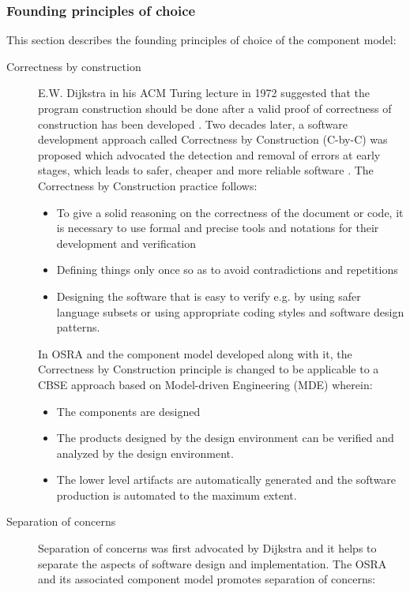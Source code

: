 \subsubsection{\textbf{Founding principles of choice}}
This section describes the founding principles of choice of the component model:

\begin{description}
\item[Correctness by construction] E.W. Dijkstra in his ACM Turing lecture in 1972 suggested that the program construction should be done after a valid proof of correctness of construction has been developed \cite{CompBasedProcess}. Two decades later, a software development approach called Correctness by Construction (C-by-C) was proposed which advocated the detection and removal of errors at early stages, which leads to safer, cheaper and more reliable software \cite{CompBasedProcess,PhdThesis}. The Correctness by Construction practice follows:
\begin{itemize}
\item To give a solid reasoning on the correctness of the document or code, it is necessary to use formal and precise tools and notations for their development and verification 
\item Defining things only once so as to avoid contradictions and repetitions
\item Designing the software that is easy to verify e.g. by using safer language subsets or using appropriate coding styles and software design patterns. 
\end{itemize}

In OSRA and the component model developed along with it, the Correctness by Construction principle is changed to be applicable to a CBSE approach based on Model-driven Engineering (MDE) \cite{CompBasedProcess} wherein:

\begin{itemize}
\item The components are designed
\item The products designed by the design environment can be verified and analyzed by the design environment.
\item The lower level artifacts are automatically generated and the software production is automated to the maximum extent.  
\end{itemize}

\item [Separation of concerns] 
\label{section: Founding principle-Separation of concerns} 
Separation of concerns was first advocated by Dijkstra \cite{CompBasedProcess} and it helps to separate the aspects of software design and implementation. The OSRA and its associated component model promotes separation of concerns\cite{CompBasedProcess,PhdThesis}:


\end{description}
